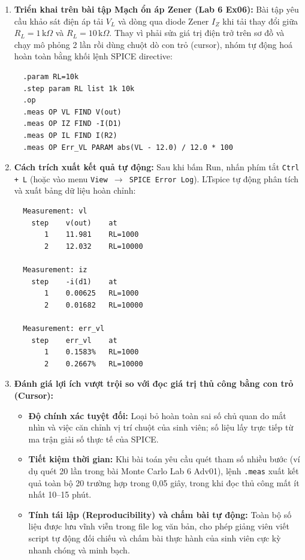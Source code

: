 \documentclass[12pt,a4paper]{article}
\begin{document}
\begin{enumerate}[label=(\alph*)]
  \item \textbf{Triển khai trên bài tập Mạch ổn áp Zener (Lab 6 Ex06):}
  Bài tập yêu cầu khảo sát điện áp tải $V_L$ và dòng qua diode Zener $I_Z$ khi tải thay đổi giữa $R_L = 1\,\text{k}\Omega$ và $R_L = 10\,\text{k}\Omega$. Thay vì phải sửa giá trị điện trở trên sơ đồ và chạy mô phỏng 2 lần rồi dùng chuột dò con trỏ (cursor), nhóm tự động hoá hoàn toàn bằng khối lệnh SPICE directive:
  \begin{verbatim}
  .param RL=10k
  .step param RL list 1k 10k
  .op
  .meas OP VL FIND V(out)
  .meas OP IZ FIND -I(D1)
  .meas OP IL FIND I(R2)
  .meas OP Err_VL PARAM abs(VL - 12.0) / 12.0 * 100
  \end{verbatim}

  \item \textbf{Cách trích xuất kết quả tự động:}
  Sau khi bấm Run, nhấn phím tắt \texttt{Ctrl + L} (hoặc vào menu \texttt{View $\rightarrow$ SPICE Error Log}). LTspice tự động phân tích và xuất bảng dữ liệu hoàn chỉnh:
  \begin{verbatim}
  Measurement: vl
    step    v(out)    at
       1    11.981    RL=1000
       2    12.032    RL=10000

  Measurement: iz
    step    -i(d1)    at
       1    0.00625   RL=1000
       2    0.01682   RL=10000

  Measurement: err_vl
    step    err_vl    at
       1    0.1583%   RL=1000
       2    0.2667%   RL=10000
  \end{verbatim}

  \item \textbf{Đánh giá lợi ích vượt trội so với đọc giá trị thủ công bằng con trỏ (Cursor):}
  \begin{itemize}
    \item \textbf{Độ chính xác tuyệt đối:} Loại bỏ hoàn toàn sai số chủ quan do mắt nhìn và việc căn chỉnh vị trí chuột của sinh viên; số liệu lấy trực tiếp từ ma trận giải số thực tế của SPICE.
    \item \textbf{Tiết kiệm thời gian:} Khi bài toán yêu cầu quét tham số nhiều bước (ví dụ quét 20 lần trong bài Monte Carlo Lab 6 Adv01), lệnh \texttt{.meas} xuất kết quả toàn bộ 20 trường hợp trong 0,05 giây, trong khi đọc thủ công mất ít nhất 10--15 phút.
    \item \textbf{Tính tái lập (Reproducibility) và chấm bài tự động:} Toàn bộ số liệu được lưu vĩnh viễn trong file log văn bản, cho phép giảng viên viết script tự động đối chiếu và chấm bài thực hành của sinh viên cực kỳ nhanh chóng và minh bạch.
  \end{itemize}
\end{enumerate}
\end{document}
